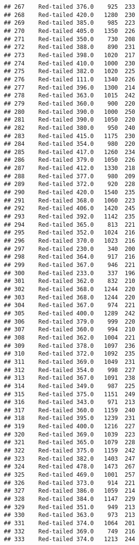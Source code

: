 \documentclass[
]{article}
\begin{document}
\begin{verbatim}
## 267    Red-tailed 376.0    925  233
## 268    Red-tailed 420.0   1280  230
## 269    Red-tailed 385.0    985  223
## 270    Red-tailed 405.0   1350  226
## 271    Red-tailed 350.0    730  208
## 272    Red-tailed 388.0    890  231
## 273    Red-tailed 398.0   1020  217
## 274    Red-tailed 410.0   1000  230
## 275    Red-tailed 382.0   1020  225
## 276    Red-tailed 111.0   1340  226
## 277    Red-tailed 396.0   1300  214
## 278    Red-tailed 363.0   1015  242
## 279    Red-tailed 360.0    900  220
## 280    Red-tailed 390.0   1000  250
## 281    Red-tailed 390.0   1050  220
## 282    Red-tailed 380.0    950  240
## 283    Red-tailed 415.0   1175  230
## 284    Red-tailed 354.0    980  220
## 285    Red-tailed 417.0   1260  234
## 286    Red-tailed 379.0   1050  226
## 287    Red-tailed 412.0   1330  218
## 288    Red-tailed 377.0    980  209
## 289    Red-tailed 372.0    920  228
## 290    Red-tailed 420.0   1540  235
## 291    Red-tailed 368.0   1060  223
## 292    Red-tailed 406.0   1420  245
## 293    Red-tailed 392.0   1142  235
## 294    Red-tailed 365.0    813  221
## 295    Red-tailed 352.0   1024  216
## 296    Red-tailed 370.0   1023  216
## 297    Red-tailed 230.0    340  200
## 298    Red-tailed 364.0    917  216
## 299    Red-tailed 367.0    946  221
## 300    Red-tailed 233.0    337  196
## 301    Red-tailed 362.0    832  210
## 302    Red-tailed 368.0   1244  220
## 303    Red-tailed 368.0   1244  220
## 304    Red-tailed 367.0    974  221
## 305    Red-tailed 400.0   1289  242
## 306    Red-tailed 379.0    999  220
## 307    Red-tailed 360.0    994  210
## 308    Red-tailed 362.0   1004  221
## 309    Red-tailed 378.0   1097  236
## 310    Red-tailed 372.0   1092  235
## 311    Red-tailed 369.0   1049  231
## 312    Red-tailed 354.0    998  227
## 313    Red-tailed 367.0   1091  238
## 314    Red-tailed 349.0    987  225
## 315    Red-tailed 375.0   1151  249
## 316    Red-tailed 343.0    971  213
## 317    Red-tailed 360.0   1159  240
## 318    Red-tailed 395.0   1239  231
## 319    Red-tailed 400.0   1216  227
## 320    Red-tailed 369.0   1039  223
## 321    Red-tailed 365.0   1079  228
## 322    Red-tailed 375.0   1159  242
## 323    Red-tailed 382.0   1403  247
## 324    Red-tailed 478.0   1473  267
## 325    Red-tailed 469.0   1001  257
## 326    Red-tailed 373.0    914  221
## 327    Red-tailed 386.0   1059  214
## 328    Red-tailed 384.0   1147  229
## 329    Red-tailed 351.0    949  213
## 330    Red-tailed 363.0    973  213
## 331    Red-tailed 374.0   1064  201
## 332    Red-tailed 369.0    749  216
## 333    Red-tailed 374.0   1213  244

\end{verbatim}
\end{document}
